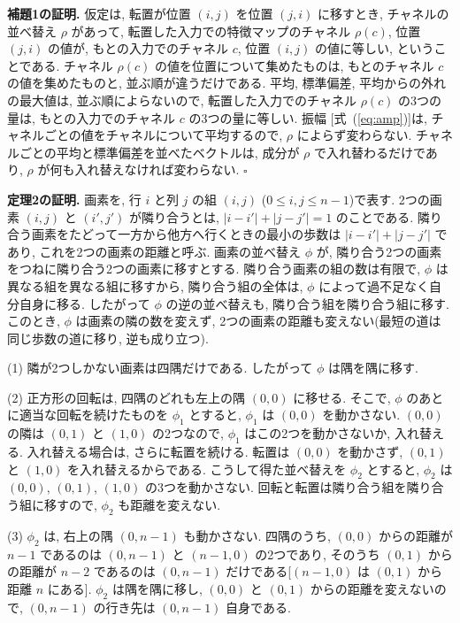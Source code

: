 \documentclass[MIRU,submit]{miru2025j}
\renewcommand{\eqref}[1]{(\ref{#1})}
\begin{document}
\textbf{補題1の証明.} 仮定は, 転置が位置 $(i,j)$ を位置 $(j,i)$ に移すとき, チャネルの並べ替え $\rho$ があって, 転置した入力での特徴マップのチャネル $\rho(c)$, 位置 $(j,i)$ の値が, もとの入力でのチャネル $c$, 位置 $(i,j)$ の値に等しい, ということである. チャネル $\rho(c)$ の値を位置について集めたものは, もとのチャネル $c$ の値を集めたものと, 並ぶ順が違うだけである. 平均, 標準偏差, 平均からの外れの最大値は, 並ぶ順によらないので, 転置した入力でのチャネル $\rho(c)$ の3つの量は, もとの入力でのチャネル $c$ の3つの量に等しい. 振幅 [式~\eqref{eq:amp}]は, チャネルごとの値をチャネルについて平均するので, $\rho$ によらず変わらない. チャネルごとの平均と標準偏差を並べたベクトルは, 成分が $\rho$ で入れ替わるだけであり, $\rho$ が何も入れ替えなければ変わらない. \hfill$\square$

\textbf{定理2の証明.} 画素を, 行 $i$ と列 $j$ の組 $(i,j)$ ($0\leq i,j\leq n-1$)で表す. 2つの画素 $(i,j)$ と $(i',j')$ が隣り合うとは, $|i-i'|+|j-j'|=1$ のことである. 隣り合う画素をたどって一方から他方へ行くときの最小の歩数は $|i-i'|+|j-j'|$ であり, これを2つの画素の距離と呼ぶ. 画素の並べ替え $\phi$ が, 隣り合う2つの画素をつねに隣り合う2つの画素に移すとする. 隣り合う画素の組の数は有限で, $\phi$ は異なる組を異なる組に移すから, 隣り合う組の全体は, $\phi$ によって過不足なく自分自身に移る. したがって $\phi$ の逆の並べ替えも, 隣り合う組を隣り合う組に移す. このとき, $\phi$ は画素の隣の数を変えず, 2つの画素の距離も変えない(最短の道は同じ歩数の道に移り, 逆も成り立つ).

(1) 隣が2つしかない画素は四隅だけである. したがって $\phi$ は隅を隅に移す.

(2) 正方形の回転は, 四隅のどれも左上の隅 $(0,0)$ に移せる. そこで, $\phi$ のあとに適当な回転を続けたものを $\phi_1$ とすると, $\phi_1$ は $(0,0)$ を動かさない. $(0,0)$ の隣は $(0,1)$ と $(1,0)$ の2つなので, $\phi_1$ はこの2つを動かさないか, 入れ替える. 入れ替える場合は, さらに転置を続ける. 転置は $(0,0)$ を動かさず, $(0,1)$ と $(1,0)$ を入れ替えるからである. こうして得た並べ替えを $\phi_2$ とすると, $\phi_2$ は $(0,0)$, $(0,1)$, $(1,0)$ の3つを動かさない. 回転と転置は隣り合う組を隣り合う組に移すので, $\phi_2$ も距離を変えない.

(3) $\phi_2$ は, 右上の隅 $(0,n-1)$ も動かさない. 四隅のうち, $(0,0)$ からの距離が $n-1$ であるのは $(0,n-1)$ と $(n-1,0)$ の2つであり, そのうち $(0,1)$ からの距離が $n-2$ であるのは $(0,n-1)$ だけである[$(n-1,0)$ は $(0,1)$ から距離 $n$ にある]. $\phi_2$ は隅を隅に移し, $(0,0)$ と $(0,1)$ からの距離を変えないので, $(0,n-1)$ の行き先は $(0,n-1)$ 自身である.
\end{document}
